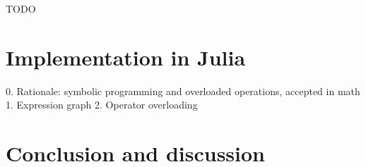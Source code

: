 \documentclass[conference]{IEEEtran}
\begin{document}
TODO

\section{Implementation in Julia}

0. Rationale: symbolic programming and overloaded operations, accepted in math
1. Expression graph
2. Operator overloading

\newpage

\section{Conclusion and discussion}





 




\end{document}
